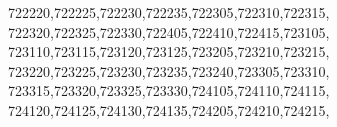 \documentclass[
  12,
  dvipsnames]{article}
\newenvironment{Shaded}{\begin{snugshade}}{\end{snugshade}}
\newcommand{\NormalTok}[1]{#1}
\newcommand{\StringTok}[1]{\textcolor[rgb]{0.31,0.60,0.02}{#1}}
\begin{document}
\begin{Shaded}
\begin{Highlighting}[]
                  \StringTok{\textquotesingle{}722220\textquotesingle{}}\NormalTok{,}\StringTok{\textquotesingle{}722225\textquotesingle{}}\NormalTok{,}\StringTok{\textquotesingle{}722230\textquotesingle{}}\NormalTok{,}\StringTok{\textquotesingle{}722235\textquotesingle{}}\NormalTok{,}\StringTok{\textquotesingle{}722305\textquotesingle{}}\NormalTok{,}\StringTok{\textquotesingle{}722310\textquotesingle{}}\NormalTok{,}\StringTok{\textquotesingle{}722315\textquotesingle{}}\NormalTok{,}
                  \StringTok{\textquotesingle{}722320\textquotesingle{}}\NormalTok{,}\StringTok{\textquotesingle{}722325\textquotesingle{}}\NormalTok{,}\StringTok{\textquotesingle{}722330\textquotesingle{}}\NormalTok{,}\StringTok{\textquotesingle{}722405\textquotesingle{}}\NormalTok{,}\StringTok{\textquotesingle{}722410\textquotesingle{}}\NormalTok{,}\StringTok{\textquotesingle{}722415\textquotesingle{}}\NormalTok{,}\StringTok{\textquotesingle{}723105\textquotesingle{}}\NormalTok{,}
                  \StringTok{\textquotesingle{}723110\textquotesingle{}}\NormalTok{,}\StringTok{\textquotesingle{}723115\textquotesingle{}}\NormalTok{,}\StringTok{\textquotesingle{}723120\textquotesingle{}}\NormalTok{,}\StringTok{\textquotesingle{}723125\textquotesingle{}}\NormalTok{,}\StringTok{\textquotesingle{}723205\textquotesingle{}}\NormalTok{,}\StringTok{\textquotesingle{}723210\textquotesingle{}}\NormalTok{,}\StringTok{\textquotesingle{}723215\textquotesingle{}}\NormalTok{,}
                  \StringTok{\textquotesingle{}723220\textquotesingle{}}\NormalTok{,}\StringTok{\textquotesingle{}723225\textquotesingle{}}\NormalTok{,}\StringTok{\textquotesingle{}723230\textquotesingle{}}\NormalTok{,}\StringTok{\textquotesingle{}723235\textquotesingle{}}\NormalTok{,}\StringTok{\textquotesingle{}723240\textquotesingle{}}\NormalTok{,}\StringTok{\textquotesingle{}723305\textquotesingle{}}\NormalTok{,}\StringTok{\textquotesingle{}723310\textquotesingle{}}\NormalTok{,}
                  \StringTok{\textquotesingle{}723315\textquotesingle{}}\NormalTok{,}\StringTok{\textquotesingle{}723320\textquotesingle{}}\NormalTok{,}\StringTok{\textquotesingle{}723325\textquotesingle{}}\NormalTok{,}\StringTok{\textquotesingle{}723330\textquotesingle{}}\NormalTok{,}\StringTok{\textquotesingle{}724105\textquotesingle{}}\NormalTok{,}\StringTok{\textquotesingle{}724110\textquotesingle{}}\NormalTok{,}\StringTok{\textquotesingle{}724115\textquotesingle{}}\NormalTok{,}
                  \StringTok{\textquotesingle{}724120\textquotesingle{}}\NormalTok{,}\StringTok{\textquotesingle{}724125\textquotesingle{}}\NormalTok{,}\StringTok{\textquotesingle{}724130\textquotesingle{}}\NormalTok{,}\StringTok{\textquotesingle{}724135\textquotesingle{}}\NormalTok{,}\StringTok{\textquotesingle{}724205\textquotesingle{}}\NormalTok{,}\StringTok{\textquotesingle{}724210\textquotesingle{}}\NormalTok{,}\StringTok{\textquotesingle{}724215\textquotesingle{}}\NormalTok{,}

\end{Highlighting}
\end{Shaded}
\end{document}
